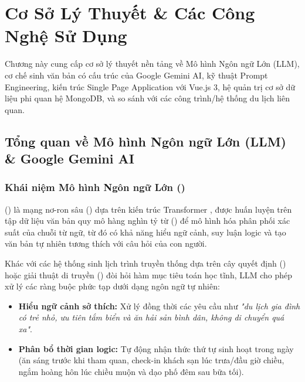 \chapter{Cơ Sở Lý Thuyết \& Các Công Nghệ Sử Dụng}

\begin{muctieu}
Chương này cung cấp cơ sở lý thuyết nền tảng về Mô hình Ngôn ngữ Lớn (LLM), cơ chế sinh văn bản có cấu trúc của Google Gemini AI, kỹ thuật Prompt Engineering, kiến trúc Single Page Application với Vue.js 3, hệ quản trị cơ sở dữ liệu phi quan hệ MongoDB, và so sánh với các công trình/hệ thống du lịch liên quan.
\end{muctieu}

\section{Tổng quan về Mô hình Ngôn ngữ Lớn (LLM) \& Google Gemini AI}

\subsection{Khái niệm Mô hình Ngôn ngữ Lớn ()}

\begin{dinhnghia}
 () là mạng nơ-ron sâu () dựa trên kiến trúc Transformer \cite{Vaswani2017}, được huấn luyện trên tập dữ liệu văn bản quy mô hàng nghìn tỷ từ () để mô hình hóa phân phối xác suất của chuỗi từ ngữ, từ đó có khả năng hiểu ngữ cảnh, suy luận logic và tạo văn bản tự nhiên tương thích với câu hỏi của con người.
\end{dinhnghia}

Khác với các hệ thống sinh lịch trình truyền thống dựa trên cây quyết định () hoặc giải thuật di truyền () đòi hỏi hàm mục tiêu toán học tĩnh, LLM cho phép xử lý các ràng buộc phức tạp dưới dạng ngôn ngữ tự nhiên:
\begin{itemize}
    \item \textbf{Hiểu ngữ cảnh sở thích:} Xử lý đồng thời các yêu cầu như \textit{"du lịch gia đình có trẻ nhỏ, ưu tiên tắm biển và ăn hải sản bình dân, không di chuyển quá xa"}.
    \item \textbf{Phân bổ thời gian logic:} Tự động nhận thức thứ tự sinh hoạt trong ngày (ăn sáng trước khi tham quan, check-in khách sạn lúc trưa/đầu giờ chiều, ngắm hoàng hôn lúc chiều muộn và dạo phố đêm sau bữa tối).
\end{itemize}

